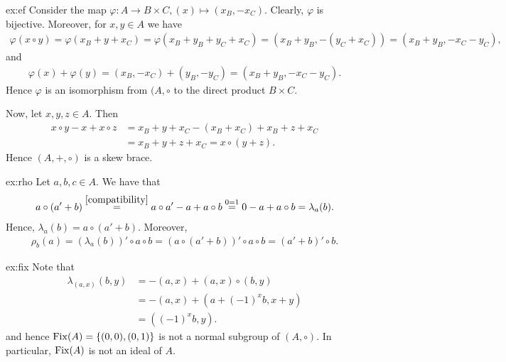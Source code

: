 \begin{sol}{ex:ef}
    Consider the map $\varphi:A\to B\times C, (x) \mapsto (x_B,-x_C)$. Clearly, $\varphi$ is bijective. Moreover, for $x,y\in A$ we have
    \begin{align*}
        \varphi(x\circ y) = \varphi(x_B+y+x_C) = \varphi(x_B+y_B+y_C+x_C) 
        =(x_B+y_B,-(y_C+x_C)) = (x_B+y_B,-x_C-y_C),
    \end{align*}
    and 
    \begin{align*}
        \varphi(x)+\varphi(y) = (x_B,-x_C) + (y_B,-y_C) = (x_B+y_B,-x_C-y_C).
    \end{align*}
    Hence $\varphi$ is an isomorphism from $(A,\circ$ to the direct product $B\times C$.
    
    Now, let $x,y,z \in A$. Then 
    \begin{align*}
        x\circ y - x + x\circ z &= x_B + y + x_C - (x_B+x_C) +x_B + z + x_C\\
        &=x_B + y + z + x_C = x \circ (y+z).
    \end{align*}
    Hence $(A,+,\circ)$ is a skew brace.
\end{sol}

\begin{sol}{ex:rho}
    Let $a,b,c\in A$. We have that
    \begin{align*}
        a\circ(a'+b) \overset{\eqref{compatibility}}{=} a \circ a' - a + a\circ b \overset{0=1}{=} 0 - a + a\circ b = \lambda_a(b).
    \end{align*}
    Hence, $\lambda_a(b)= a\circ(a'+b)$. Moreover,
    \begin{align*}
        \rho_b(a) = (\lambda_a(b))'\circ a \circ b =(a\circ(a'+b))' \circ a \circ b
        = (a'+b)'\circ b.
    \end{align*}
\end{sol}

\begin{sol}{ex:fix}
    Note that  
    \begin{align*}
        \lambda_{(a,x)}(b,y) &= - (a,x) + (a,x)\circ (b,y)\\ &= -(a,x)+(a+(-1)^xb, x+y) \\&=((-1)^xb,y).
    \end{align*}
    and hence $\operatorname{Fix}(A) = \{(0,0),(0,1)\}$ is not a normal subgroup of $(A,\circ)$. 
    In particular, $\operatorname{Fix}(A)$ is not an ideal of $A$.
\end{sol}